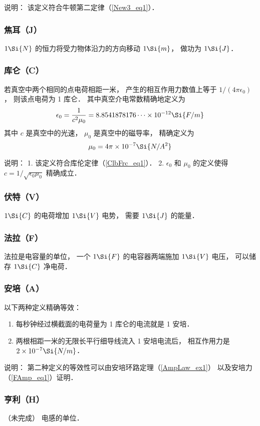 说明： 该定义符合牛顿第二定律（\autoref{New3_eq1}）．

\subsubsection{焦耳（J）}
$1\Si{N}$ 的恒力将受力物体沿力的方向移动 $1\Si{m}$， 做功为 $1\Si{J}$．

\subsubsection{库仑（C）}
若真空中两个相同的点电荷相距一米， 产生的相互作用力数值上等于 $1/(4\pi\epsilon_0)$， 则该点电荷为 1 库仑． 其中真空介电常数精确地定义为
\begin{equation}
\epsilon_0 = \frac{1}{c^2 \mu_0} = 8.8541878176\dots \times 10^{-12} \Si{F/m}
\end{equation}
其中 $c$ 是真空中的光速， $\mu_0$ 是真空中的磁导率， 精确定义为
\begin{equation}
\mu_0 = 4\pi \times 10^{-7} \Si{N/A^2}
\end{equation}

说明： 1. 该定义符合库伦定律（\autoref{ClbFrc_eq1}）． 2. $\epsilon_0$ 和 $\mu_0$ 的定义使得 $c = 1/\sqrt{\epsilon_0 \mu_0}$ 精确成立．

\subsubsection{伏特（V）}
$1\Si{C}$ 的电荷增加 $1\Si{V}$ 电势， 需要 $1\Si{J}$ 的能量．

\subsubsection{法拉（F）}
法拉是电容量的单位， 一个 $1\Si{F}$ 的电容器两端施加 $1\Si{V}$ 电压， 可以储存 $1\Si{C}$ 净电荷．

\subsubsection{安培（A）}
以下两种定义精确等效：
\begin{enumerate}
\item 每秒钟经过横截面的电荷量为 1 库仑的电流就是 1 安培．
\item 两根相距一米的无限长平行细导线流入 1 安培电流后， 相互作用力是 $2 \times 10^{-7}\Si{N/m}$． 
\end{enumerate}

说明： 第二种定义的等效性可以由安培环路定理（\autoref{AmpLaw_ex1}） 以及安培力（\autoref{FAmp_eq1}）证明．

\subsubsection{亨利（H）}
（未完成） 电感的单位．

